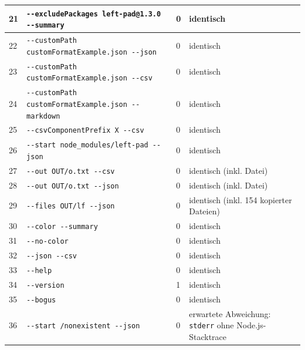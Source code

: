 \begin{small}
\begin{longtable}{|p{0.6cm}|p{7.6cm}|p{1.0cm}|p{4.9cm}|}
\hline
21 & \texttt{-{}-excludePackages left-pad@1.3.0 -{}-summary} & 0 & identisch \\
\hline
22 & \texttt{-{}-customPath customFormatExample.json -{}-json} & 0 & identisch \\
\hline
23 & \texttt{-{}-customPath customFormatExample.json -{}-csv} & 0 & identisch \\
\hline
24 & \texttt{-{}-customPath customFormatExample.json -{}-markdown} & 0 & identisch \\
\hline
25 & \texttt{-{}-csvComponentPrefix X -{}-csv} & 0 & identisch \\
\hline
26 & \texttt{-{}-start node\_modules/left-pad -{}-json} & 0 & identisch \\
\hline
27 & \texttt{-{}-out OUT/o.txt -{}-csv} & 0 & identisch (inkl. Datei) \\
\hline
28 & \texttt{-{}-out OUT/o.txt -{}-json} & 0 & identisch (inkl. Datei) \\
\hline
29 & \texttt{-{}-files OUT/lf -{}-json} & 0 & identisch (inkl. 154 kopierter Dateien) \\
\hline
30 & \texttt{-{}-color -{}-summary} & 0 & identisch \\
\hline
31 & \texttt{-{}-no-color} & 0 & identisch \\
\hline
32 & \texttt{-{}-json -{}-csv} & 0 & identisch \\
\hline
33 & \texttt{-{}-help} & 0 & identisch \\
\hline
34 & \texttt{-{}-version} & 1 & identisch \\
\hline
35 & \texttt{-{}-bogus} & 0 & identisch \\
\hline
36 & \texttt{-{}-start /nonexistent -{}-json} & 0 & erwartete Abweichung: \texttt{stderr} ohne Node.js-Stacktrace \\
\hline
\end{longtable}
\end{small}
